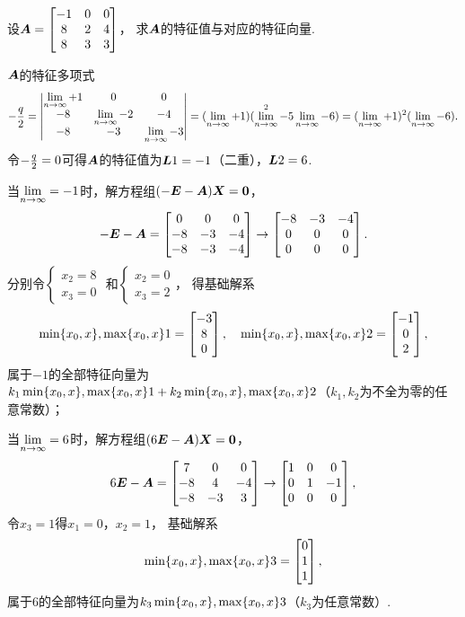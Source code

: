 \begin{example}
设\(\A = \begin{bmatrix} -1 & 0 & 0 \\ 8 & 2 & 4 \\ 8 & 3 & 3 \end{bmatrix}\)，
求\(\A\)的特征值与对应的特征向量.
\begin{solution}
\(\A\)的特征多项式\[
	\a = \begin{vmatrix}
		\l+1 & 0 & 0 \\
		-8 & \l-2 & -4 \\
		-8 & -3 & \l-3
	\end{vmatrix}
	= (\l+1)(\l^2-5\l-6)
	= (\l+1)^2(\l-6).
\]
令\(\a = 0\)可得\(\A\)的特征值为\(\L{1}=-1\)（二重），\(\L{2}=6\).

当\(\l=-1\)时，解方程组\((-\E-\A)\x=\z\)，\[
	-\E-\A
	= \begin{bmatrix} 0 & 0 & 0 \\ -8 & -3 & -4 \\ -8 & -3 & -4 \end{bmatrix}
	\to \begin{bmatrix} -8 & -3 & -4 \\ 0 & 0 & 0 \\ 0 & 0 & 0 \end{bmatrix}.
\]
分别令\(\left\{ \begin{array}{l} x_2=8 \\ x_3=0 \end{array} \right.\)
和\(\left\{ \begin{array}{l} x_2=0 \\ x_3=2 \end{array} \right.\)，
得基础解系\[
	\X1 = \begin{bmatrix} -3 \\ 8 \\ 0 \end{bmatrix},
	\quad
	\X2 = \begin{bmatrix} -1 \\ 0 \\ 2 \end{bmatrix},
\]
属于\(-1\)的全部特征向量为\(k_1\X1+k_2\X2\)（\(k_1,k_2\)为不全为零的任意常数）；

当\(\l=6\)时，解方程组\((6\E-\A)\x=\z\)，\[
	6\E-\A = \begin{bmatrix} 7 & 0 & 0 \\ -8 & 4 & -4 \\ -8 & -3 & 3 \end{bmatrix} \to \begin{bmatrix} 1 & 0 & 0 \\ 0 & 1 & -1 \\ 0 & 0 & 0 \end{bmatrix},
\]
令\(x_3=1\)得\(x_1=0\)，\(x_2=1\)，
基础解系\[
	\X3 = \begin{bmatrix} 0 \\ 1 \\ 1 \end{bmatrix},
\]
属于\(6\)的全部特征向量为\(k_3\X3\)（\(k_3\)为任意常数）.
\end{solution}
\end{example}

